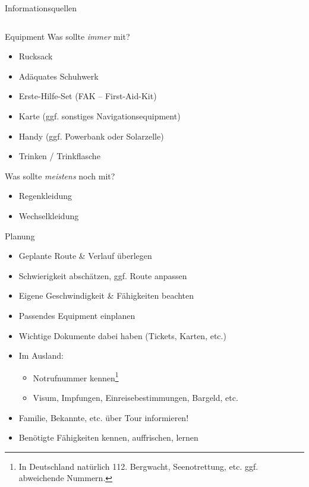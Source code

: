 \documentclass[aspectratio=169]{beamer}
\begin{document}
\begin{frame}{Informationsquellen}
\begin{columns}[T]
\begin{column}{0.39\textwidth}
				\end{column}
			\end{columns}
		\end{frame}
		
		\begin{frame}{Equipment}
			Was sollte \textit{immer} mit?
			\begin{itemize}
				\item Rucksack
				\item Adäquates Schuhwerk
				\item Erste-Hilfe-Set (FAK -- First-Aid-Kit)
				\item Karte (ggf. sonstiges Navigationsequipment)
				\item Handy (ggf. Powerbank oder Solarzelle)
				\item Trinken / Trinkflasche
			\end{itemize}\pause
			Was sollte \textit{meistens} noch mit?
			\begin{itemize}
				\item Regenkleidung
				\item Wechselkleidung
			\end{itemize}
		\end{frame}
		
		\begin{frame}{Planung}
			\begin{itemize}
				\item Geplante Route \& Verlauf überlegen
				\item Schwierigkeit abschätzen, ggf. Route anpassen
				\item Eigene Geschwindigkeit \& Fähigkeiten beachten
				\item Passendes Equipment einplanen
				\item Wichtige Dokumente dabei haben (Tickets, Karten, etc.)
				\item Im Ausland:
				\begin{itemize}
					\item Notrufnummer kennen\footnote{In Deutschland natürlich 112. Bergwacht, Seenotrettung, etc. ggf. abweichende Nummern.}
					\item Visum, Impfungen, Einreisebestimmungen, Bargeld, etc.
				\end{itemize}
				\item Familie, Bekannte, etc. über Tour informieren!
				\item Benötigte Fähigkeiten kennen, auffrischen, lernen
			\end{itemize}
		\end{frame}
	
\end{document}
